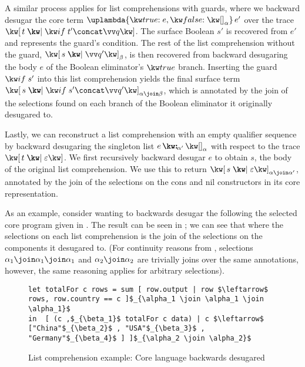 A similar process applies for list comprehensions with guards, where we backward desugar the core term $\exApp{\exLambda{\elimBool{e}{\annNil{\alpha}}}}{e'}$ over the trace $\exListComp{t}{\qualGuard{t'} \concat \vec{q}}$. The surface Boolean $s'$ is recovered from $e'$ and represents the guard's condition. The rest of the list comprehension without the guard, $\annListComp{s}{\vec{q}'}{\beta}$, is then recovered from backward desugaring the body $e$ of the Boolean eliminator's $\exTrue$ branch. Inserting the guard $\qualGuard{s'}$ into this list comprehension yields the final surface term $\annListComp{s}{\qualGuard{s'} \concat \vec{q}'}{\alpha \join \beta}$, which is annotated by the join of the selections found on each branch of the Boolean eliminator it originally desugared to.

Lastly, we can reconstruct a list comprehension with an empty qualifier sequence by backward desugaring the singleton list $\annCons{e}{\annNil{\alpha}}{\alpha'}$ with respect to the trace $\exListComp{t}{\seqEmpty}$. We first recursively backward desugar $e$ to obtain $s$, the body of the original list comprehension. We use this to return $\annListComp{s}{\seqEmpty}{\alpha \join \alpha'}$, annotated by the join of the selections on the cons and nil constructors in its core representation.

As an example, consider wanting to backwards desugar the following the selected core program given in . The result can be seen in ; we can see that where the selections on each list comprehension is the join of the selections on the components it desugared to. (For continuity reasons from , selections $\alpha_1 \join \alpha_1 \join \alpha_1$ and $\alpha_2 \join \alpha_2$ are trivially joins over the same annotations, however, the same reasoning applies for arbitrary selections).

\begin{figure}[H]
\small
\begin{lstlisting}
let totalFor c rows = sum [ row.output | row $\leftarrow$ rows, row.country == c ]$_{\alpha_1 \join \alpha_1 \join \alpha_1}$
in  [ (c ,$_{\beta_1}$ totalFor c data) | c $\leftarrow$ ["China"$_{\beta_2}$ , "USA"$_{\beta_3}$ , "Germany"$_{\beta_4}$ ] ]$_{\alpha_2 \join \alpha_2}$
\end{lstlisting}
\caption{List comprehension example: Core language backwards desugared}
\label{fig:surface-language:example-5}
\end{figure}


